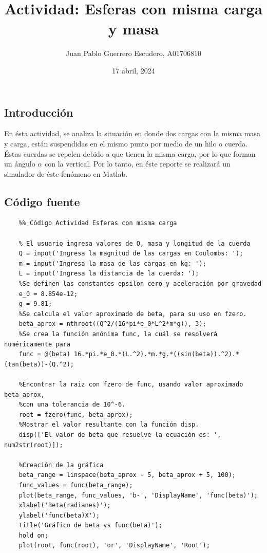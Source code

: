 \documentclass[12pt, letterpaper]{report}
\title{Actividad: Esferas con misma carga y masa}
\author{Juan Pablo Guerrero Escudero, A01706810}
\date{17 abril, 2024}
\begin{document}
\maketitle
\subsection*{Introducción}
En ésta actividad, se analiza la situación en donde dos cargas con la misma masa y carga, están suspendidas en el mismo punto por medio de un hilo o cuerda. Éstas cuerdas 
se repelen debido a que tienen la misma carga, por lo que forman un ángulo $\alpha$ con la vertical. Por lo tanto, en éste reporte 
se realizará un simulador de éste fenómeno en Matlab.  
\subsection*{Código fuente}
\begin{verbatim}
    %% Código Actividad Esferas con misma carga 

    % El usuario ingresa valores de Q, masa y longitud de la cuerda
    Q = input('Ingresa la magnitud de las cargas en Coulombs: '); 
    m = input('Ingresa la masa de las cargas en kg: '); 
    L = input('Ingresa la distancia de la cuerda: '); 
    %Se definen las constantes epsilon cero y aceleración por gravedad 
    e_0 = 8.854e-12; 
    g = 9.81;
    %Se calcula el valor aproximado de beta, para su uso en fzero. 
    beta_aprox = nthroot((Q^2/(16*pi*e_0*L^2*m*g)), 3); 
    %Se crea la función anónima func, la cuál se resolverá numéricamente para 
    func = @(beta) 16.*pi.*e_0.*(L.^2).*m.*g.*((sin(beta)).^2).*(tan(beta))-(Q.^2);     
    
    %Encontrar la raiz con fzero de func, usando valor aproximado beta_aprox,
    %con una tolerancia de 10^-6. 
    root = fzero(func, beta_aprox); 
    %Mostrar el valor resultante con la función disp. 
    disp(['El valor de beta que resuelve la ecuación es: ', num2str(root)]);
    
    %Creación de la gráfica 
    beta_range = linspace(beta_aprox - 5, beta_aprox + 5, 100);  
    func_values = func(beta_range);
    plot(beta_range, func_values, 'b-', 'DisplayName', 'func(beta)');
    xlabel('Beta(radianes)');
    ylabel('func(beta)X');
    title('Gráfico de beta vs func(beta)');
    hold on;
    plot(root, func(root), 'or', 'DisplayName', 'Root');
\end{verbatim}
\end{document}
